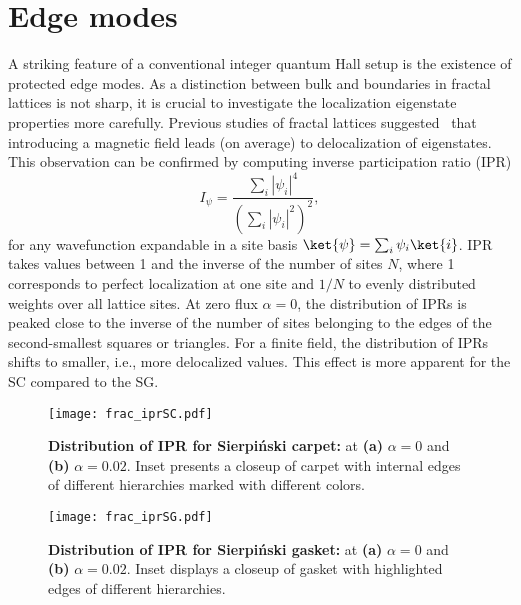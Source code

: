 {\section{Edge modes}
\label{sec:frac_edgemodes}
A striking feature of a conventional integer quantum Hall setup is the existence of protected edge modes. As a distinction between bulk and boundaries in fractal lattices is not sharp, it is crucial to investigate the localization eigenstate properties more carefully. Previous studies of fractal lattices suggested~\cite{supp1, supp2} that introducing a magnetic field leads (on average) to delocalization of eigenstates. This observation can be confirmed by computing inverse participation ratio (IPR)
\begin{equation}
I_{\psi} = \frac{\sum_i | \psi_i |^4}{\left(\sum_i  |\psi_i |^2 \right)^2}, 
\label{eq:ipr}
\end{equation}
for any wavefunction expandable in a site basis $\ket{\psi} = \sum_i \psi_i \ket{i}$. IPR takes values between 1 and the inverse of the number of sites $N$, where 1 corresponds to perfect localization at one site and $1/N$ to evenly distributed weights over all lattice sites. At zero flux $\alpha = 0$, the distribution of IPRs is peaked close to the inverse of the number of sites belonging to the edges of the second-smallest squares or triangles. For a finite field, the distribution of IPRs shifts to smaller, i.e., more delocalized values. This effect is more apparent for the SC compared to the SG.

\begin{figure}[H]
\centering
\texttt{[image: frac\_iprSC.pdf]}
\caption{\textbf{Distribution of IPR for Sierpiński carpet:} at \textbf{(a)} $\alpha = 0$ and \textbf{(b)} $\alpha = 0.02$. Inset presents a closeup of carpet with internal edges of different hierarchies marked with different colors.}
\label{fig:IPR_SC}
\end{figure}

\begin{figure}[H]
\centering
\texttt{[image: frac\_iprSG.pdf]}
\caption{\textbf{Distribution of IPR for Sierpiński gasket:} at \textbf{(a)} $\alpha = 0$ and \textbf{(b)} $\alpha = 0.02$. Inset displays a closeup of gasket with highlighted edges of different hierarchies.}
\label{fig:IPR_SG}
\end{figure}

}
